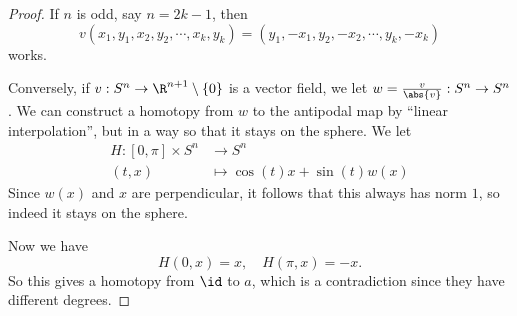 \documentclass[a4paper]{article}
\begin{document}
\begin{proof}
  If $n$ is odd, say $n = 2k - 1$, then
  \[
    v(x_1, y_1, x_2, y_2, \cdots, x_k, y_k) = (y_1, -x_1, y_2, -x_2, \cdots, y_k, -x_k)
  \]
  works.

  Conversely, if $v: S^n \to \R^{n + 1} \setminus \{0\}$ is a vector field, we let $w = \frac{v}{\abs{v}}: S^n \to S^n$. We can construct a homotopy from $w$ to the antipodal map by ``linear interpolation'', but in a way so that it stays on the sphere. We let
  \begin{align*}
    H: [0, \pi] \times S^n &\to S^n\\
    (t, x) &\mapsto \cos(t) x + \sin(t) w(x)
  \end{align*}
  Since $w(x)$ and $x$ are perpendicular, it follows that this always has norm $1$, so indeed it stays on the sphere.

  Now we have
  \[
    H(0, x) = x,\quad H(\pi, x) = -x.
  \]
  So this gives a homotopy from $\id$ to $a$, which is a contradiction since they have different degrees.
\end{proof}
\end{document}
